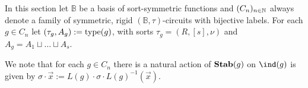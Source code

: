\documentclass[../paper.tex]{subfiles}
\begin{document}
In this section let $\mathbb{B}$ be a basis of sort-symmetric functions and
$(C_n)_{n \in \mathbb{N}}$ always denote a family of symmetric, rigid $(\mathbb{B},
\tau)$-circuits with bijective labels. For each $g \in C_n$ let $(\tau_g, A_g)
:= \text{type}(g)$, with sorts $\tau_g = (R, [s], \nu)$ and $A_g = A_1 \sqcup \ldots
\sqcup A_s$.

We note that for each $g \in C_n$ there is a natural action of $\text{\textbf{Stab}}(g)$ on
$\ind(g)$ is given by $\sigma \cdot \vec{x} := L(g) \cdot \sigma \cdot L(g)^{-1}
(\vec{x})$.
%





\end{document}
